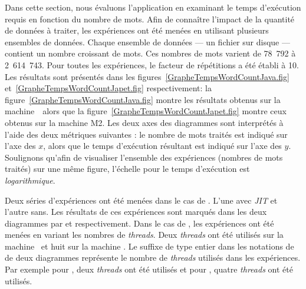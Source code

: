 %

Dans cette section, nous 
\'evaluons l'application  en examinant le temps d'ex\'ecution requis en fonction du nombre de mots. Afin de conna\^itre l'impact de la quantit\'e de donn\'ees \`a traiter, les exp\'eriences ont \'et\'e men\'ees en utilisant plusieurs ensembles de donn\'ees. Chaque ensemble de donn\'ees --- un fichier sur disque --- contient un nombre croissant de mots. Ces nombres de mots varient de 78~792 \`a 2~614~743. Pour toutes les exp\'eriences, le facteur de r\'ep\'etitions a \'et\'e \'etabli \`a 10.  Les r\'esultats sont pr\'esent\'es dans les figures~\ref{GrapheTempsWordCountJava.fig} et~\ref{GrapheTempsWordCountJapet.fig} respectivement: la figure~\ref{GrapheTempsWordCountJava.fig} montre les résultats obtenus sur la machine~\ alors que la figure~\ref{GrapheTempsWordCountJapet.fig} montre ceux obtenus sur la machine M2.  Les deux axes des diagrammes sont interpr\'et\'es \`a l'aide des deux m\'etriques suivantes : le nombre de mots trait\'es est indiqu\'e sur l'axe des $x$, alors que le temps d'ex\'ecution r\'esultant est indiqu\'e sur l'axe des $y$.  Soulignons qu'afin de visualiser l'ensemble des exp\'eriences (nombres de mots trait\'es) sur une m\^eme figure, l'\'echelle pour le temps d'ex\'ecution est \emph{logarithmique}. 

Deux s\'eries d'exp\'eriences ont \'et\'e men\'ees dans le cas de . L'une avec \emph{JIT} et l'autre sans. Les r\'esultats de ces exp\'eriences sont marqu\'es dans les deux diagrammes par  et  respectivement. Dans le cas de , les exp\'eriences ont \'et\'e men\'ees en variant les nombres de \emph{threads}. Deux \emph{threads} ont \'et\'e utilis\'es sur la machine \ et huit sur la machine . Le suffixe de type entier dans les notations de  de deux diagrammes repr\'esente le nombre de \emph{threads} utilis\'es dans les exp\'eriences. Par exemple pour , deux \emph{threads} ont \'et\'e utilis\'es et pour , quatre \emph{threads} ont \'et\'e utilis\'es.



